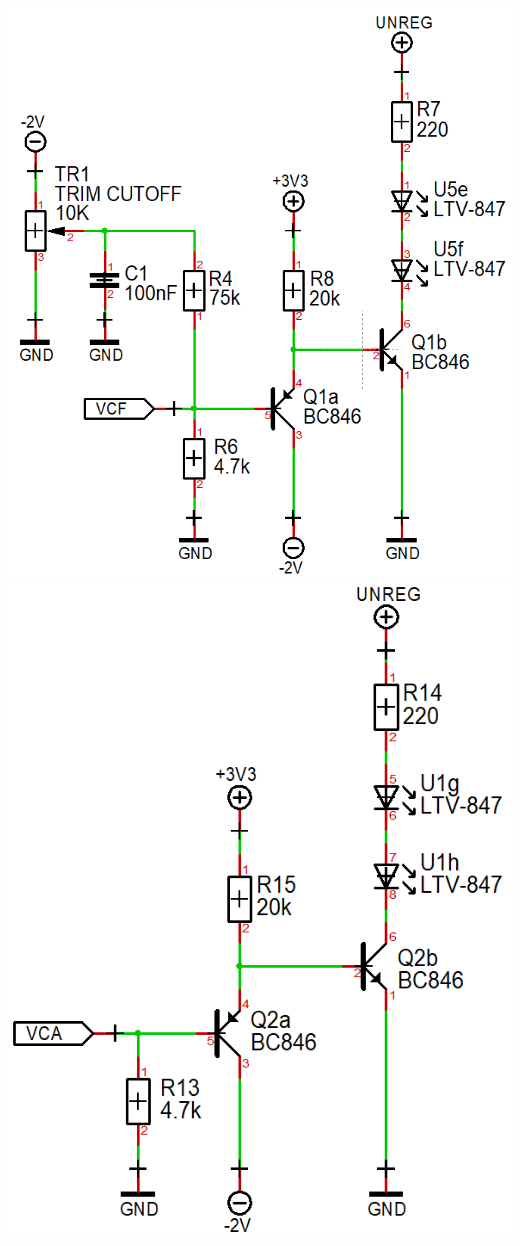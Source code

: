 \documentclass{scrartcl}
\begin{document}
\begin{center}
    \includegraphics[scale=0.40]{assets/schema-expo-vcf.png}
    \includegraphics[scale=0.40]{assets/schema-expo-vca.png}
\end{center}
\end{document}
